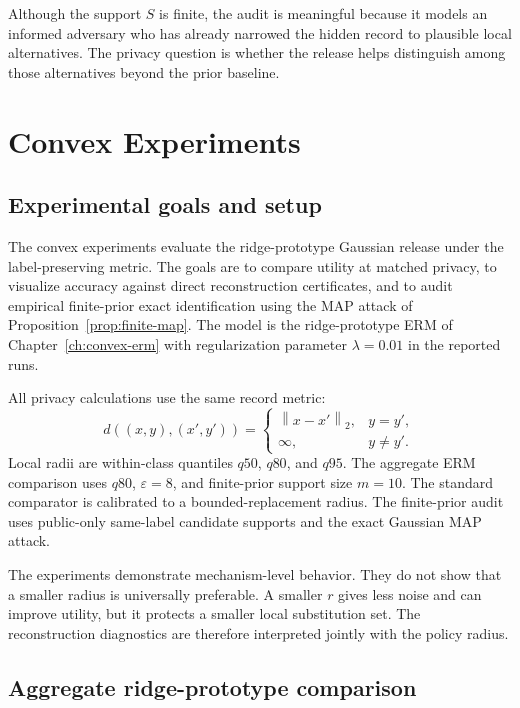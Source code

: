 \documentclass[11pt,a4paper]{report}
\theoremstyle{plain}
\theoremstyle{definition}
\theoremstyle{remark}
\newcommand{\norm}[1]{\left\lVert #1\right\rVert}
\begin{document}
Although the support $S$ is finite, the audit is meaningful because it models an informed adversary who has already narrowed the hidden record to plausible local alternatives.  The privacy question is whether the release helps distinguish among those alternatives beyond the prior baseline.

\chapter{Convex Experiments}
\label{ch:convex-experiments}

\section{Experimental goals and setup}
\label{sec:convex-experimental-goals}

The convex experiments evaluate the ridge-prototype Gaussian release under the label-preserving metric.  The goals are to compare utility at matched privacy, to visualize accuracy against direct reconstruction certificates, and to audit empirical finite-prior exact identification using the MAP attack of Proposition~\ref{prop:finite-map}.  The model is the ridge-prototype ERM of Chapter~\ref{ch:convex-erm} with regularization parameter $\lambda=0.01$ in the reported runs.

All privacy calculations use the same record metric:
\[
 d((x,y),(x',y'))=
 \begin{cases}
 \norm{x-x'}_2,& y=y',\\
 \infty,& y\ne y'.
 \end{cases}
\]
Local radii are within-class quantiles $q50$, $q80$, and $q95$.  The aggregate ERM comparison uses $q80$, $\varepsilon=8$, and finite-prior support size $m=10$.  The standard comparator is calibrated to a bounded-replacement radius.  The finite-prior audit uses public-only same-label candidate supports and the exact Gaussian MAP attack.

The experiments demonstrate mechanism-level behavior.  They do not show that a smaller radius is universally preferable.  A smaller $r$ gives less noise and can improve utility, but it protects a smaller local substitution set.  The reconstruction diagnostics are therefore interpreted jointly with the policy radius.

\section{Aggregate ridge-prototype comparison}
\label{sec:aggregate-ridge-comparison}
\end{document}
